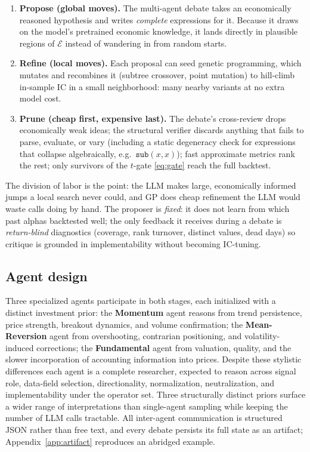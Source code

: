 \documentclass{article}
\theoremstyle{definition}
\theoremstyle{plain}
\theoremstyle{remark}
\newcommand{\Expr}{\mathcal{E}}
\begin{document}
\begin{enumerate}[leftmargin=1.6em,itemsep=3pt]
  \item \textbf{Propose (global moves).} The multi-agent debate takes an economically
  reasoned hypothesis and writes \emph{complete} expressions for it. Because it draws
  on the model's pretrained economic knowledge, it lands directly in plausible regions
  of $\Expr$ instead of wandering in from random starts.
  \item \textbf{Refine (local moves).} Each proposal can seed genetic programming,
  which mutates and recombines it (subtree crossover, point mutation) to hill-climb
  in-sample IC in a small neighborhood: many nearby variants at no extra model cost.
  \item \textbf{Prune (cheap first, expensive last).} The debate's cross-review drops
  economically weak ideas; the structural verifier discards anything that fails to
  parse, evaluate, or vary (including a static degeneracy check for expressions that
  collapse algebraically, e.g.\ $\mathtt{sub}(x,x)$); fast approximate metrics rank the
  rest; only survivors of the $t$-gate \eqref{eq:gate} reach the full backtest.
\end{enumerate}

The division of labor is the point: the LLM makes large, economically informed jumps a
local search never could, and GP does cheap refinement the LLM would waste calls doing
by hand. The proposer is \emph{fixed}: it does not learn from which past alphas
backtested well; the only feedback it receives during a debate is \emph{return-blind}
diagnostics (coverage, rank turnover, distinct values, dead days) so critique is
grounded in implementability without becoming IC-tuning.

\subsection{Agent design}

Three specialized agents participate in both stages, each initialized with a distinct
investment prior: the \textbf{Momentum} agent reasons from trend persistence, price
strength, breakout dynamics, and volume confirmation; the \textbf{Mean-Reversion} agent
from overshooting, contrarian positioning, and volatility-induced corrections; the
\textbf{Fundamental} agent from valuation, quality, and the slower incorporation of
accounting information into prices. Despite these stylistic differences each agent is a
complete researcher, expected to reason across signal role, data-field selection,
directionality, normalization, neutralization, and implementability under the operator
set. Three structurally distinct priors surface a wider range of interpretations than
single-agent sampling while keeping the number of LLM calls tractable. All inter-agent
communication is structured JSON rather than free text, and every debate persists its
full state as an artifact; Appendix~\ref{app:artifact} reproduces an abridged example.
\end{document}
